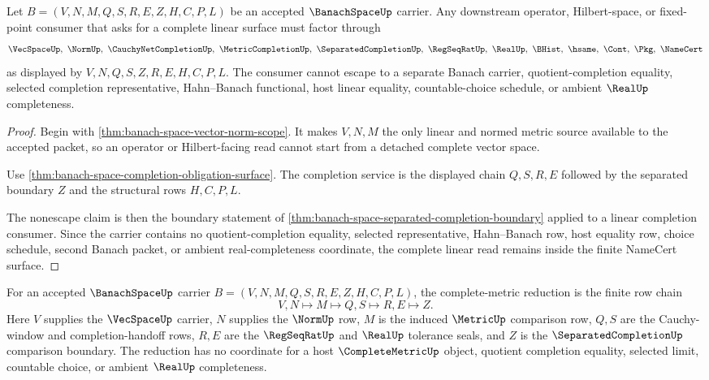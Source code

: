 \begin{theorem}
\label{thm:banach-space-linear-completion-nonescape}
Let $B=(V,N,M,Q,S,R,E,Z,H,C,P,L)$ be an accepted $\BanachSpaceUp$ carrier. Any downstream operator, Hilbert-space, or fixed-point consumer that asks for a complete linear surface must factor through
$$
\VecSpaceUp,\ \NormUp,\ \CauchyNetCompletionUp,\ \MetricCompletionUp,\ \SeparatedCompletionUp,\ \RegSeqRatUp,\ \RealUp,\ \BHist,\ \hsame,\ \Cont,\ \Pkg,\ \NameCert
$$
as displayed by $V,N,Q,S,Z,R,E,H,C,P,L$. The consumer cannot escape to a separate Banach carrier, quotient-completion equality, selected completion representative, Hahn--Banach functional, host linear equality, countable-choice schedule, or ambient $\RealUp$ completeness.
\end{theorem}
\begin{proof}
Begin with \autoref{thm:banach-space-vector-norm-scope}. It makes $V,N,M$ the only linear and normed metric source available to the accepted packet, so an operator or Hilbert-facing read cannot start from a detached complete vector space.

Use \autoref{thm:banach-space-completion-obligation-surface}. The completion service is the displayed chain $Q,S,R,E$ followed by the separated boundary $Z$ and the structural rows $H,C,P,L$.

The nonescape claim is then the boundary statement of \autoref{thm:banach-space-separated-completion-boundary} applied to a linear completion consumer. Since the carrier contains no quotient-completion equality, selected representative, Hahn--Banach row, host equality row, choice schedule, second Banach packet, or ambient real-completeness coordinate, the complete linear read remains inside the finite NameCert surface.
\end{proof}

\begin{definition}
\label{def:banach-space-complete-metric-reduction}
For an accepted $\BanachSpaceUp$ carrier $B=(V,N,M,Q,S,R,E,Z,H,C,P,L)$, the complete-metric reduction is the finite row chain
$$
V,N \longmapsto M \longmapsto Q,S \longmapsto R,E \longmapsto Z .
$$
Here $V$ supplies the $\VecSpaceUp$ carrier, $N$ supplies the $\NormUp$ row, $M$ is the induced $\MetricUp$ comparison row, $Q,S$ are the Cauchy-window and completion-handoff rows, $R,E$ are the $\RegSeqRatUp$ and $\RealUp$ tolerance seals, and $Z$ is the $\SeparatedCompletionUp$ comparison boundary. The reduction has no coordinate for a host $\CompleteMetricUp$ object, quotient completion equality, selected limit, countable choice, or ambient $\RealUp$ completeness.
\end{definition}

